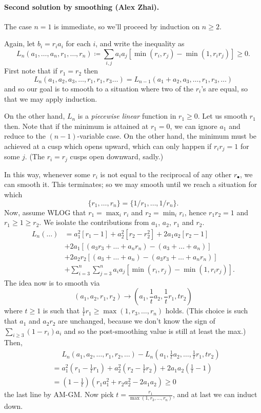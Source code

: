 \documentclass[11pt]{scrartcl}
\begin{document}
\paragraph{Second solution by smoothing (Alex Zhai).}
The case $n=1$ is immediate, so we'll proceed by induction on $n \ge 2$.

Again, let $b_i = r_i a_i$ for each $i$, and
write the inequality as
\[ L_n(a_1, \dots, a_n, r_1, \dots, r_n)
  \coloneqq \sum_{i,j} a_i a_j \left[
  \min (r_i, r_j) - \min(1, r_i r_j) \right] \ge 0. \]
First note that if $r_1 = r_2$ then
\[ L_n(a_1, a_2, a_3, \dots, r_1, r_1, r_3 \dots)
  = L_{n-1}(a_1+a_2, a_3, \dots, r_1, r_3, \dots) \]
and so our goal is to smooth to a situation
where two of the $r_i$'s are equal,
so that we may apply induction.

On the other hand, $L_n$ is a \emph{piecewise linear} function in $r_1 \ge 0$.
Let us smooth $r_1$ then.
Note that if the minimum is attained at $r_1 = 0$,
we can ignore $a_1$ and reduce to the $(n-1)$-variable case.
On the other hand, the minimum must be achieved at a cusp
which opens upward, which can only happen if $r_i r_j = 1$ for some $j$.
(The $r_i = r_j$ cusps open downward, sadly.)

In this way, whenever some $r_i$ is not equal to the reciprocal
of any other $r_\bullet$, we can smooth it.
This terminates; so we may smooth until we reach a situation for which
\[ \{ r_1, \dots, r_n \} = \{ 1/r_1, \dots, 1/r_n \}. \]
Now, assume WLOG that $r_1 = \max_i r_i$ and $r_2 = \min_i r_i$,
hence $r_1 r_2 = 1$ and $r_1 \ge 1 \ge r_2$.
We isolate the contributions from $a_1$, $a_2$, $r_1$ and $r_2$.
\begin{align*}
  L_n(\dots) &= a_1^2 \left[ r_1 - 1  \right] + a_2^2 \left[ r_2 - r_2^2 \right]
    + 2a_1a_2 \left[ r_2 - 1 \right] \\
  &+ 2a_1 \left[ (a_3r_3+\dots+a_n r_n) - (a_3+\dots+a_n) \right] \\
  &+ 2a_2r_2 \left[ (a_3+\dots+a_n) - (a_3r_3+\dots+a_n r_n) \right] \\
  &+ \sum_{i=3}^n \sum_{j=3}^n a_i a_j \left[
    \min (r_i, r_j) - \min(1, r_i r_j) \right].
\end{align*}
The idea now is to smooth via
\[ (a_1, a_2, r_1, r_2)
  \longrightarrow
  \left( a_1, \frac 1t a_2, \frac 1t r_1, tr_2 \right) \]
where $t \ge 1$ is such that
$\frac 1t r_1 \ge \max(1, r_3, \dots, r_n)$ holds.
(This choice is such that $a_1$ and $a_2 r_2$ are unchanged,
because we don't know the sign of $\sum_{i \ge 3} (1-r_i) a_i$
and so the post-smoothing value is still at least the max.)
Then,
\begin{align*}
  &\phantom{ {} = {} } L_n(a_1, a_2, \dots, r_1, r_2, \dots)
  - L_n\left(a_1, \frac 1t a_2, \dots, \frac1t r_1, tr_2\right) \\
  &= a_1^2 \left( r_1 - \frac 1t r_1 \right)
  + a_2^2 \left( r_2 - \frac 1t r_2 \right)
  + 2a_1a_2 \left( \frac 1t - 1 \right) \\
  &= \left( 1 - \frac 1t \right) \left( r_1 a_1^2 + r_2 a_2^2 - 2a_1a_2 \right)
  \ge 0
\end{align*}
the last line by AM-GM.
Now pick $t = \frac{r_1}{\max(1, r_3, \dots, r_n)}$,
and at last we can induct down.
\pagebreak
\end{document}
